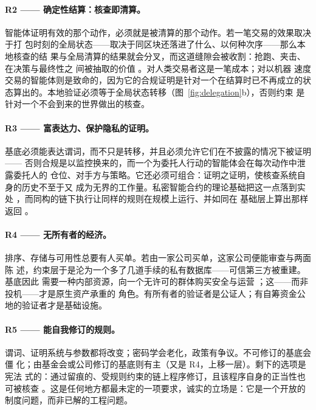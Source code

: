\documentclass[11pt,UTF8]{ctexart}
\newcommand{\R}[1]{R#1}
\begin{document}
\paragraph{\R{2} —— 确定性结算：核查即清算。}
智能体证明有效的那个动作，必须就是被清算的那个动作。若一笔交易的效果取决于打
包时刻的全局状态——取决于同区块还落进了什么、以何种次序——那么本地核查的结
果与全局清算的结果就会分叉，而这道缝隙会被收割：抢跑、夹击、在决策与最终性之
间被抽取的价值 \citep{daian2020flashboys}。对人类交易者这是一笔成本；对以机器
速度交易的智能体则是致命的，因为它的合规证明是针对一个在结算时已不再成立的状
态算出的。本地验证必须等于全局状态转移（图~\ref{fig:delegation}b），否则约束
是针对一个不会到来的世界做出的核查。

\paragraph{\R{3} —— 富表达力、保护隐私的证明。}
基底必须能表达谓词，而不只是转移，并且必须允许它们在不披露的情况下被证明——
否则合规是以监控换来的，而一个为委托人行动的智能体会在每次动作中泄露委托人的
仓位、对手方与策略。它还必须可组合：证明之证明，使核查系统自身的历史不至于又
成为无界的工作量。私密智能合约的理论基础把这一点落到实处
\citep{kerber2021kachina}，而同构的链下执行让同样的规则在规模上运行、并如同在
基础层上算出那样返回 \citep{chakravarty2021hydra}。

\paragraph{\R{4} —— 无所有者的经济。}
排序、存储与可用性总要有人买单。若由一家公司买单，这家公司便能审查与两面陈
述，约束层于是沦为一个多了几道手续的私有数据库——可信第三方被重建。基底因此
需要一种内部资源，向一个无许可的群体购买安全与运营
\citep{nakamoto2008,brunjes2020rewards}；这——而非投机——才是原生资产承重的
角色。有所有者的验证者是公证人；有自筹资金公地的验证者才是基础设施。

\paragraph{\R{5} —— 能自我修订的规则。}
谓词、证明系统与参数都将改变；密码学会老化，政策有争议。不可修订的基底会僵
化；由基金会或公司修订的基底则有主（又是 \R{4}，上移一层）。剩下的选项是宪法
式的：通过留痕的、受规则约束的链上程序修订，且该程序自身的正当性也可被核查
\citep{cip1694}。这是任何地方都最未定的一项要求，诚实的立场是：它是一个开放的
制度问题，而非已解的工程问题。
\end{document}

